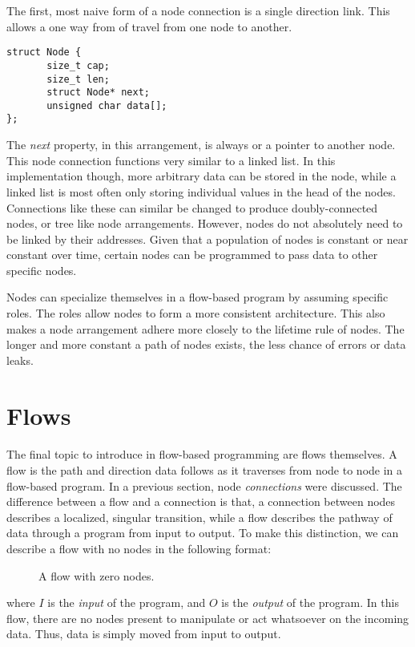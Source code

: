 \par The first, most naive form of a node connection is a single direction link. This allows a one way from of travel from one node to another.

\begin{lstlisting}[style=customc]
struct Node {
       size_t cap;
       size_t len;
       struct Node* next;
       unsigned char data[];
};
\end{lstlisting}

\par The \emph{next} property, in this arrangement, is always  or a pointer to another node. This node connection functions very similar to a linked list. In this implementation though, more arbitrary data can be stored in the node, while a linked list is most often only storing individual values in the head of the nodes. Connections like these can similar be changed to produce doubly-connected nodes, or tree like node arrangements. However, nodes do not absolutely need to be linked by their addresses. Given that a population of nodes is constant or near constant over time, certain nodes can be programmed to pass data to other specific nodes.

\par Nodes can specialize themselves in a flow-based program by assuming specific roles. The roles allow nodes to form a more consistent architecture. This also makes a node arrangement adhere more closely to the lifetime rule of nodes. The longer and more constant a path of nodes exists, the less chance of errors or data leaks.

\section{Flows}

\paragraph{  } The final topic to introduce in flow-based programming are flows themselves. A flow is  the path and direction data follows as it traverses from node to node in a flow-based program. In a previous section, node \emph{connections} were discussed. The difference between a flow and a connection is that, a connection between nodes describes a localized, singular transition, while a flow describes the pathway of data through a program from input to output. To make this distinction, we can describe a flow with no nodes in the following format:

\begin{figure}[h]
\centering
{}
\caption{A flow with zero nodes.}
\end{figure}

where $I$ is the \emph{input} of the program, and $O$ is the \emph{output} of the program. In this flow, there are no nodes present to manipulate or act whatsoever on the incoming data. Thus, data is simply moved from input to output.



